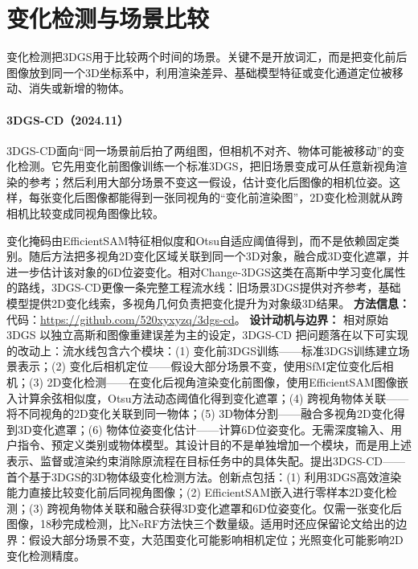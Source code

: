 \section{变化检测与场景比较}

变化检测把3DGS用于比较两个时间的场景。关键不是开放词汇，而是把变化前后图像放到同一个3D坐标系中，利用渲染差异、基础模型特征或变化通道定位被移动、消失或新增的物体。
\paragraph{3DGS-CD（2024.11）\cite{2411_03706}}
3DGS-CD面向“同一场景前后拍了两组图，但相机不对齐、物体可能被移动”的变化检测。它先用变化前图像训练一个标准3DGS，把旧场景变成可从任意新视角渲染的参考；然后利用大部分场景不变这一假设，估计变化后图像的相机位姿。这样，每张变化后图像都能得到一张同视角的“变化前渲染图”，2D变化检测就从跨相机比较变成同视角图像比较。

变化掩码由EfficientSAM特征相似度和Otsu自适应阈值得到，而不是依赖固定类别。随后方法把多视角2D变化区域关联到同一个3D对象，融合成3D变化遮罩，并进一步估计该对象的6D位姿变化。相对Change-3DGS这类在高斯中学习变化属性的路线，3DGS-CD更像一条完整工程流水线：旧场景3DGS提供对齐参考，基础模型提供2D变化线索，多视角几何负责把变化提升为对象级3D结果。
\textbf{方法信息：} 代码：\url{https://github.com/520xyxyzq/3dgs-cd}。
\textbf{设计动机与边界：} 相对原始 3DGS 以独立高斯和图像重建误差为主的设定，3DGS-CD 把问题落在以下可实现的改动上：流水线包含六个模块：(1) 变化前3DGS训练——标准3DGS训练建立场景表示；(2) 变化后相机定位——假设大部分场景不变，使用SfM定位变化后相机；(3) 2D变化检测——在变化后视角渲染变化前图像，使用EfficientSAM图像嵌入计算余弦相似度，Otsu方法动态阈值化得到变化遮罩；(4) 跨视角物体关联——将不同视角的2D变化关联到同一物体；(5) 3D物体分割——融合多视角2D变化得到3D变化遮罩；(6) 物体位姿变化估计——计算6D位姿变化。无需深度输入、用户指令、预定义类别或物体模型。其设计目的不是单独增加一个模块，而是用上述表示、监督或渲染约束消除原流程在目标任务中的具体失配。提出3DGS-CD——首个基于3DGS的3D物体级变化检测方法。创新点包括：(1) 利用3DGS高效渲染能力直接比较变化前后同视角图像；(2) EfficientSAM嵌入进行零样本2D变化检测；(3) 跨视角物体关联和融合获得3D变化遮罩和6D位姿变化。仅需一张变化后图像，18秒完成检测，比NeRF方法快三个数量级。适用时还应保留论文给出的边界：假设大部分场景不变，大范围变化可能影响相机定位；光照变化可能影响2D变化检测精度。
